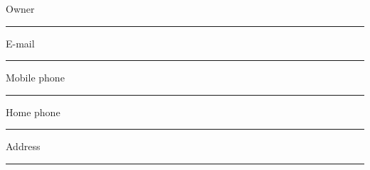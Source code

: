 \thispagestyle{empty}

\noindent
Owner \
\vspace{-.1in} \\ \rule{\textwidth}{.2pt}
\vspace{.5in}

\noindent E-mail \
\vspace{-.1in} \\ \rule{\textwidth}{.2pt}
\vspace{.5in}

\noindent Mobile phone \
\vspace{-.1in} \\ \rule{\textwidth}{.2pt}
\vspace{.5in}

\noindent Home phone \
\vspace{-.1in} \\ \rule{\textwidth}{.2pt}
\vspace{.5in}

\noindent Address \
\vspace{-.1in} \\ \rule{\textwidth}{.2pt}

\vspace{0.75in}
